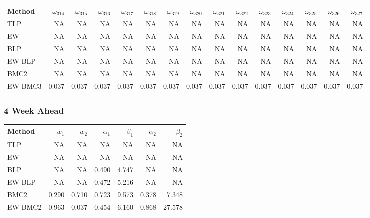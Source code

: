 \documentclass[
]{article}
\begin{document}
\begin{tabular}{lrrrrrrrrrrrrrr}
\toprule
Method & $\omega_{314}$ & $\omega_{315}$ & $\omega_{316}$ & $\omega_{317}$ & $\omega_{318}$ & $\omega_{319}$ & $\omega_{320}$ & $\omega_{321}$ & $\omega_{322}$ & $\omega_{323}$ & $\omega_{324}$ & $\omega_{325}$ & $\omega_{326}$ & $\omega_{327}$\\
\midrule
TLP & NA & NA & NA & NA & NA & NA & NA & NA & NA & NA & NA & NA & NA & NA\\
EW & NA & NA & NA & NA & NA & NA & NA & NA & NA & NA & NA & NA & NA & NA\\
BLP & NA & NA & NA & NA & NA & NA & NA & NA & NA & NA & NA & NA & NA & NA\\
EW-BLP & NA & NA & NA & NA & NA & NA & NA & NA & NA & NA & NA & NA & NA & NA\\
BMC2 & NA & NA & NA & NA & NA & NA & NA & NA & NA & NA & NA & NA & NA & NA\\
EW-BMC3 & 0.037 & 0.037 & 0.037 & 0.037 & 0.037 & 0.037 & 0.037 & 0.037 & 0.037 & 0.037 & 0.037 & 0.037 & 0.037 & 0.037\\
\bottomrule
\end{tabular}

\hypertarget{week-ahead-23}{%
\subsubsection{4 Week Ahead}\label{week-ahead-23}}

\begin{tabular}{lrrrrrr}
\toprule
Method & $w_1$ & $w_2$ & $\alpha_1$ & $\beta_1$ & $\alpha_2$ & $\beta_2$\\
\midrule
TLP & NA & NA & NA & NA & NA & NA\\
EW & NA & NA & NA & NA & NA & NA\\
BLP & NA & NA & 0.490 & 4.747 & NA & NA\\
EW-BLP & NA & NA & 0.472 & 5.216 & NA & NA\\
BMC2 & 0.290 & 0.710 & 0.723 & 9.573 & 0.378 & 7.348\\
EW-BMC2 & 0.963 & 0.037 & 0.454 & 6.160 & 0.868 & 27.578\\
\bottomrule
\end{tabular}
\end{document}
